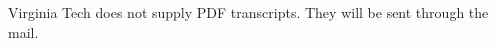 \documentclass{article}
\begin{document}
Virginia Tech does not supply PDF transcripts. They will be sent through the mail.


\end{document}
